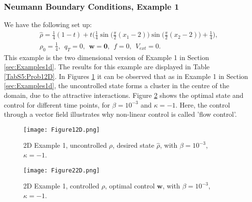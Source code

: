 \subsubsection{Neumann Boundary Conditions, Example 1}	
We have the following set up:
\begin{align*}
&\widehat \rho = \frac{1}{4}(1-t) + t\bigg(\frac{1}{4}\sin \bigg(\frac{\pi}{2}(x_1 - 2)\bigg)\sin \bigg(\frac{\pi}{2}(x_2 - 2)\bigg) + \frac{1}{4}\bigg),\\
&\rho_0 = \frac{1}{4},\ \
q_{T} = 0,\ \
\mathbf{w} = \mathbf{0},\ \
f =0,\ \
V_{ext} =0.
\end{align*}
This example is the two dimensional version of Example 1 in Section \ref{sec:Examples1d}. The results for this example are displayed in Table \ref{TabS5:Prob12D}. In Figures \ref{rhoHat2dEx2} it can be observed that as in Example 1 in Section \ref{sec:Examples1d}, the uncontrolled state forms a cluster in the centre of the domain, due to the attractive interactions. Figure \ref{rhoOpt2dEx2} shows the optimal state and control for different time points, for $\beta = 10^{-3}$ and $\kappa = -1$. Here, the control through a vector field illustrates why non-linear control is called 'flow control'. 


\begin{figure}[h]
	\texttt{[image: Figure12D.png]}
	\caption{2D Example 1, uncontrolled $\rho$, desired state $\widehat \rho$, with $\beta = 10^{-3}$, $\kappa = -1$.}
	\label{rhoHat2dEx2}
\end{figure}
\begin{figure}[h]
	\texttt{[image: Figure22D.png]}
	\caption{2D Example 1, controlled $\rho$, optimal control $\mathbf{w}$, with $\beta = 10^{-3}$, $\kappa = -1$.}
	\label{rhoOpt2dEx2}
\end{figure}



